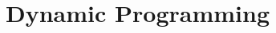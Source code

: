 \documentclass[12pt]{book}
\begin{document}

% 



% 

% 

% 

% 

\appendix

\chapter{Dynamic Programming}
\label{chapter:dp}





%
%
%
\end{document}
